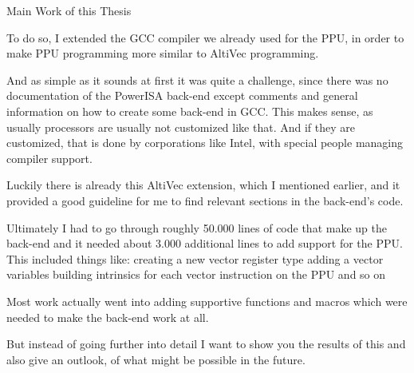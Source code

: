 \documentclass[10pt,aspectratio=169]{beamer}
\begin{document}
\begin{frame}[fragile]{Main Work of this Thesis}
{		To do so, I extended the GCC compiler we already used for the PPU, in order to make PPU programming more similar to AltiVec programming.

		And as simple as it sounds at first it was quite a challenge, since there was no documentation of the PowerISA back-end except comments and general information on how to create some back-end in GCC.
		This makes sense, as usually processors are usually not customized like that.
		And if they are customized, that is done by corporations like Intel, with special people managing compiler support.

		Luckily there is already this AltiVec extension, which I mentioned earlier, and it provided a good guideline for me to find relevant sections in the back-end's code.

		Ultimately I had to go through roughly 50.000 lines of code that make up the back-end and it needed about 3.000 additional lines to add support for the PPU.
		This included things like:
			creating a new vector register type
			adding a vector variables
			building intrinsics for each vector instruction on the PPU
			and so on
		
		Most work actually went into adding supportive functions and macros which were needed to make the back-end work at all.

		But instead of going further into detail I want to show you the results of this and also give an outlook, of what might be possible in the future.
}
\end{frame}
\end{document}
